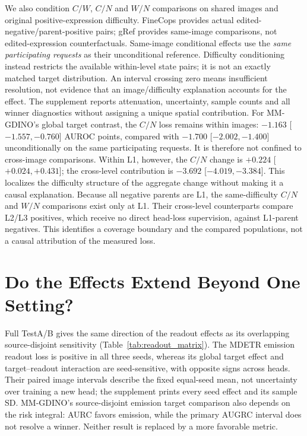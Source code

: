 \documentclass[10pt,twocolumn,letterpaper]{article}
\begin{document}
We also condition $C/W$, $C/N$ and $W/N$ comparisons on shared images
and original positive-expression difficulty. FineCops provides actual
edited-negative/parent-positive pairs; gRef provides same-image
comparisons, not edited-expression counterfactuals. Same-image
conditional effects use the \emph{same participating requests} as their
unconditional reference. Difficulty conditioning instead restricts
the available within-level state pairs; it is not an exactly matched
target distribution. An interval crossing zero means insufficient
resolution, not evidence that an image/difficulty explanation accounts
for the effect. The supplement reports attenuation, uncertainty,
sample counts and all winner diagnostics without assigning a unique
spatial contribution.
For MM-GDINO's global target contrast, the $C/N$ loss remains within
images: $-1.163$ [$-1.557,-0.760$] AUROC points, compared with
$-1.700$ [$-2.002,-1.400$] unconditionally on the same participating
requests. It is therefore not confined to cross-image comparisons.
Within L1, however, the $C/N$ change is $+0.224$
[$+0.024,+0.431$]; the cross-level contribution is
$-3.692$ [$-4.019,-3.384$]. This localizes the difficulty structure
of the aggregate change without making it a causal explanation.
Because all negative parents are L1, the same-difficulty $C/N$ and
$W/N$ comparisons exist only at L1. Their cross-level counterparts
compare L2/L3 positives, which receive no direct head-loss supervision,
against L1-parent negatives. This identifies a coverage boundary and
the compared populations, not a causal attribution of the measured loss.

\section{Do the Effects Extend Beyond One Setting?}


Full TestA/B gives the same direction of the readout effects as its
overlapping source-disjoint sensitivity (Table~\ref{tab:readout_matrix}).
The MDETR emission readout loss is positive in all three seeds, whereas
its global target effect and target--readout interaction are
seed-sensitive, with opposite signs across heads. Their paired image
intervals describe the fixed equal-seed mean, not uncertainty over
training a new head; the supplement prints every seed effect and its
sample SD. MM-GDINO's source-disjoint emission target comparison also
depends on the risk integral: AURC favors emission, while the primary
AUGRC interval does not resolve a winner. Neither result is replaced by
a more favorable metric.
\end{document}
